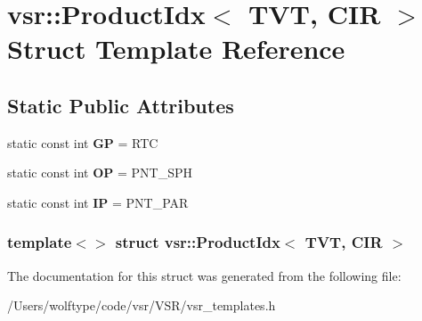 \hypertarget{structvsr_1_1_product_idx_3_01_t_v_t_00_01_c_i_r_01_4}{\section{vsr\-:\-:Product\-Idx$<$ T\-V\-T, C\-I\-R $>$ Struct Template Reference}
\label{structvsr_1_1_product_idx_3_01_t_v_t_00_01_c_i_r_01_4}
}
\subsection*{Static Public Attributes}
\begin{DoxyCompactItemize}
\item 
\hypertarget{structvsr_1_1_product_idx_3_01_t_v_t_00_01_c_i_r_01_4_a94d7125cd5daf235a845782ec4968c4e}{static const int {\bfseries G\-P} = R\-T\-C}\label{structvsr_1_1_product_idx_3_01_t_v_t_00_01_c_i_r_01_4_a94d7125cd5daf235a845782ec4968c4e}

\item 
\hypertarget{structvsr_1_1_product_idx_3_01_t_v_t_00_01_c_i_r_01_4_aa948a635a605018b0814cc3c52c21756}{static const int {\bfseries O\-P} = P\-N\-T\-\_\-\-S\-P\-H}\label{structvsr_1_1_product_idx_3_01_t_v_t_00_01_c_i_r_01_4_aa948a635a605018b0814cc3c52c21756}

\item 
\hypertarget{structvsr_1_1_product_idx_3_01_t_v_t_00_01_c_i_r_01_4_a171daa674ce8442fbac4c5cfa3f06299}{static const int {\bfseries I\-P} = P\-N\-T\-\_\-\-P\-A\-R}\label{structvsr_1_1_product_idx_3_01_t_v_t_00_01_c_i_r_01_4_a171daa674ce8442fbac4c5cfa3f06299}

\end{DoxyCompactItemize}
\subsubsection*{template$<$$>$ struct vsr\-::\-Product\-Idx$<$ T\-V\-T, C\-I\-R $>$}



The documentation for this struct was generated from the following file\-:\begin{DoxyCompactItemize}
\item 
/\-Users/wolftype/code/vsr/\-V\-S\-R/vsr\-\_\-templates.\-h\end{DoxyCompactItemize}
